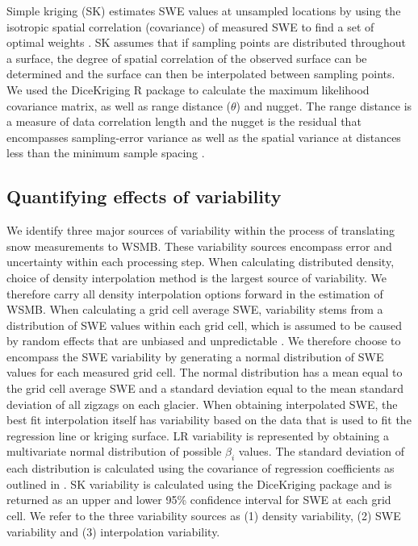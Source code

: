 \documentclass[review,oneside, letterpaper]{igs}
\begin{document}
Simple kriging (SK) estimates SWE values at unsampled locations by using the isotropic spatial correlation (covariance) of measured SWE to find a set of optimal weights \citep{Davis1986, Li2008}. SK assumes that if sampling points are distributed throughout a surface, the degree of spatial correlation of the observed surface can be determined and the surface can then be interpolated between sampling points. We used the DiceKriging R package \citep{Roustant2012} to calculate the maximum likelihood covariance matrix, as well as range distance ($\theta$) and nugget. The range distance is a measure of data correlation length and the nugget is the residual that encompasses sampling-error variance as well as the spatial variance at distances less than the minimum sample spacing \citep{Li2008}. 

\subsection{Quantifying effects of variability}

We identify three major sources of variability within the process of translating snow measurements to WSMB. These variability sources encompass error and uncertainty within each processing step. When calculating distributed density, choice of density interpolation method is the largest source of variability. We therefore carry all density interpolation options forward in the estimation of WSMB. When calculating a grid cell average SWE, variability stems from a distribution of SWE values within each grid cell, which is assumed to be caused by random effects that are unbiased and unpredictable \citep{Watson2006}. We therefore choose to encompass the SWE variability by generating a normal distribution of SWE values for each measured grid cell. The normal distribution has a mean equal to the grid cell average SWE and a standard deviation equal to the mean standard deviation of all zigzags on each glacier. When obtaining interpolated SWE, the best fit interpolation itself has variability based on the data that is used to fit the regression line or kriging surface. LR variability is represented by obtaining a multivariate normal distribution of possible $\beta_i$ values. The standard deviation of each distribution is calculated using the covariance of regression coefficients as outlined in \cite{Bagos2015}. SK variability is calculated using the DiceKriging package and is returned as an upper and lower 95\% confidence interval for SWE at each grid cell. We refer to the three variability sources as (1) density variability, (2) SWE variability and (3) interpolation variability. 
\end{document}
